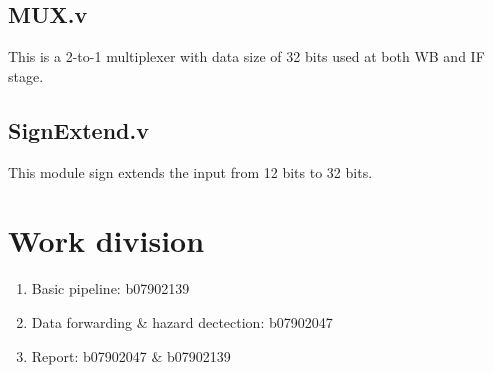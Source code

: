 \documentclass{article}
\begin{document}
\subsection{MUX.v}
This is a 2-to-1 multiplexer with data size of 32 bits used at both WB and IF stage.

\subsection{SignExtend.v}
This module sign extends the input from 12 bits to 32 bits.

\section{Work division}
\begin{enumerate}
    \item Basic pipeline: b07902139
    \item Data forwarding \& hazard dectection: b07902047
    \item Report: b07902047 \& b07902139
\end{enumerate}
\end{document}
